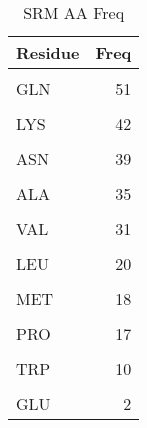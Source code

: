 	\begin{table}
		\caption{SRM AA Freq}
		\label{tbl:SRM_aaFreq}
		\centering
		\begin{tabular}{lr}
			\toprule
			Residue & Freq\\
			\midrule
			\cellcolor{gray!6}{ARG} & \cellcolor{gray!6}{83}\\
			GLN & 51\\
			\cellcolor{gray!6}{CYS} & \cellcolor{gray!6}{43}\\
			LYS & 42\\
			\cellcolor{gray!6}{THR} & \cellcolor{gray!6}{40}\\
			\addlinespace
			ASN & 39\\
			\cellcolor{gray!6}{GLY} & \cellcolor{gray!6}{37}\\
			ALA & 35\\
			\cellcolor{gray!6}{PHE} & \cellcolor{gray!6}{31}\\
			VAL & 31\\
			\addlinespace
			\cellcolor{gray!6}{ASP} & \cellcolor{gray!6}{30}\\
			LEU & 20\\
			\cellcolor{gray!6}{SER} & \cellcolor{gray!6}{20}\\
			MET & 18\\
			\cellcolor{gray!6}{ILE} & \cellcolor{gray!6}{17}\\
			\addlinespace
			PRO & 17\\
			\cellcolor{gray!6}{HIS} & \cellcolor{gray!6}{15}\\
			TRP & 10\\
			\cellcolor{gray!6}{TYR} & \cellcolor{gray!6}{6}\\
			GLU & 2\\
			\bottomrule
		\end{tabular}
	\end{table}

